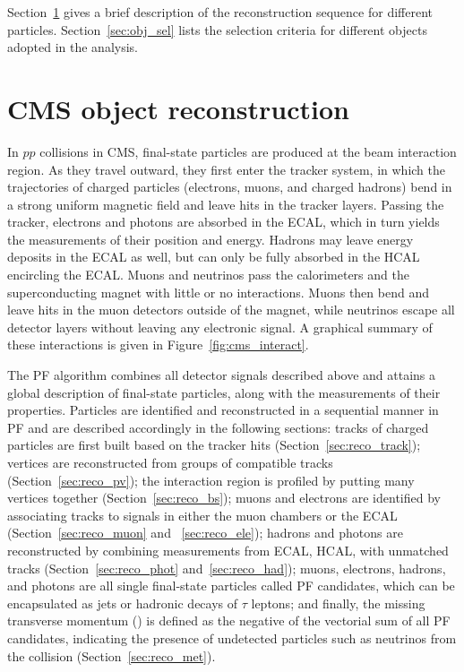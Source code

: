 Section~\ref{sec:obj_reco} gives a brief description of the reconstruction sequence for different particles.
Section~\ref{sec:obj_sel} lists the selection criteria for different objects adopted in the \hmm analysis.


\section{CMS object reconstruction}\label{sec:obj_reco}

In $pp$ collisions in CMS, final-state particles are produced at the beam interaction region. 
As they travel outward, they first enter the tracker system, in which the trajectories of charged particles 
(electrons, muons, and charged hadrons) bend in a strong uniform magnetic field and leave hits in the tracker layers. 
Passing the tracker, electrons and photons are absorbed in the ECAL, which in turn yields the measurements of their position and energy.
Hadrons may leave energy deposits in the ECAL as well, but can only be fully absorbed in the HCAL encircling the ECAL. 
Muons and neutrinos pass the calorimeters and the superconducting magnet with little or no interactions.
Muons then bend and leave hits in the muon detectors outside of the magnet, 
while neutrinos escape all detector layers without leaving any electronic signal.
A graphical summary of these interactions is given in Figure~\ref{fig:cms_interact}.

The PF algorithm combines all detector signals described above and attains a global description of final-state particles, 
along with the measurements of their properties.
Particles are identified and reconstructed in a sequential manner in PF and are described accordingly in the following sections:
tracks of charged particles are first built based on the tracker hits (Section~\ref{sec:reco_track}); 
vertices are reconstructed from groups of compatible tracks (Section~\ref{sec:reco_pv});
the interaction region is profiled by putting many vertices together (Section~\ref{sec:reco_bs});
muons and electrons are identified by associating tracks to signals in either the muon chambers or the ECAL (Section~\ref{sec:reco_muon} and ~\ref{sec:reco_ele});
hadrons and photons are reconstructed by combining measurements from ECAL, HCAL, with unmatched tracks (Section~\ref{sec:reco_phot} and~\ref{sec:reco_had});
muons, electrons, hadrons, and photons are all single final-state particles called PF candidates, 
which can be encapsulated as jets or hadronic decays of $\tau$ leptons;
and finally, the missing transverse momentum (\MET) is defined as the negative of the vectorial sum of all PF candidates,
indicating the presence of undetected particles such as neutrinos from the collision (Section~\ref{sec:reco_met}).

